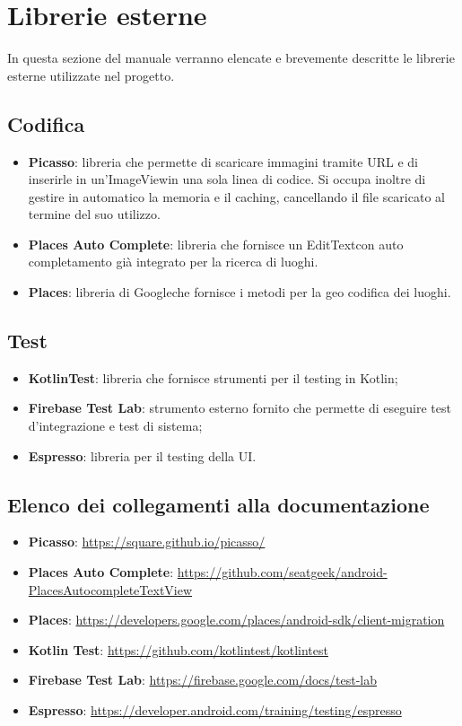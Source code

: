 \section{Librerie esterne}
In questa sezione del manuale verranno elencate e brevemente descritte le librerie esterne utilizzate nel progetto.
\subsection{Codifica}
\begin{itemize}
	\item \textbf{Picasso}: libreria che permette di scaricare immagini tramite URL e di inserirle in un'ImageView\glosp in una sola linea di codice. Si occupa inoltre di gestire in automatico la memoria e il caching, cancellando il file scaricato al termine del suo utilizzo.
	\item \textbf{Places Auto Complete}: libreria che fornisce un EditText\glosp con auto completamento già integrato per la ricerca di luoghi.
	\item \textbf{Places}: libreria di Google\glosp che fornisce i metodi per la geo codifica dei luoghi.
\end{itemize}
\subsection{Test}
\begin{itemize}
	\item \textbf{KotlinTest}: libreria che fornisce strumenti per il testing in Kotlin\glo;
	\item \textbf{Firebase Test Lab}: strumento esterno fornito che permette di eseguire test d'integrazione e test di sistema;
	\item \textbf{Espresso}: libreria per il testing della UI.
\end{itemize}
\subsection{Elenco dei collegamenti alla documentazione}
\begin{itemize}
	\item \textbf{Picasso}: \url{https://square.github.io/picasso/}
	\item \textbf{Places Auto Complete}:
	\url{https://github.com/seatgeek/android-PlacesAutocompleteTextView}
	\item \textbf{Places}:
	\url{https://developers.google.com/places/android-sdk/client-migration}
	\item \textbf{Kotlin Test}:
	\url{https://github.com/kotlintest/kotlintest}
	\item \textbf{Firebase Test Lab}:
	\url{https://firebase.google.com/docs/test-lab}
	\item \textbf{Espresso}:
	\url{https://developer.android.com/training/testing/espresso}
\end{itemize}